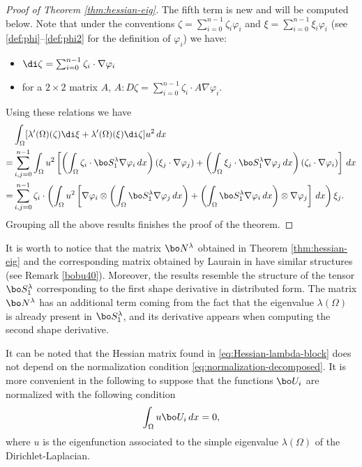 \begin{proof}[Proof of Theorem \ref{thm:hessian-eig}]
The fifth term is new and will be computed below. Note that under the conventions $\zeta = \sum_{i=0}^{n-1} \zeta_i \varphi_i$ and $\xi = \sum_{i=0}^{n-1} \xi_i \varphi_i$ (see \eqref{def:phi}--\eqref{def:phi2} for the definition of $\varphi_i$) we have:
\begin{itemize}
\item $\di \zeta = \sum_{i=0}^{n-1} \zeta_i \cdot \nabla \varphi_i$
\item for a $2\times 2$ matrix $A$, $A : D\zeta = \sum_{i=0}^{n-1} \zeta_i \cdot A\nabla \varphi_i$.
\end{itemize}
Using these relations we have
\begin{align*} &\int_\Omega [\lambda'(\Omega)(\zeta) \di \xi +\lambda'(\Omega)(\xi)\di \zeta] u^2\, dx\\
= & \sum_{i,j=0}^{n-1} \int_\Omega u^2 \left[\left(\int_\Omega \zeta_i \cdot \bo S_1^\lambda \nabla \varphi_i\, dx \right)(\xi_j \cdot \nabla \varphi_j)+\left(\int_\Omega \xi_j \cdot \bo S_1^\lambda \nabla \varphi_j\, dx \right)(\zeta_i \cdot \nabla \varphi_i)\right]\, dx\\
= & \sum_{i,j=0}^{n-1} \zeta_i\cdot \left(\int_\Omega u^2\left[\nabla \varphi_i \otimes \left(\int_\Omega \bo S_1^\lambda \nabla \varphi_j\, dx \right)
+ \left(\int_\Omega \bo S_1^\lambda \nabla \varphi_i\, dx\right)\otimes \nabla \varphi_j \right]\, dx\right) \xi_j.
\end{align*}
Grouping all the above results finishes the proof of the theorem.
\end{proof}

\begin{rem}
It is worth to notice that the matrix $\bo N^\lambda$ obtained in Theorem \ref{thm:hessian-eig} and the corresponding matrix obtained by Laurain in \cite[Prop.\,14]{laurain2ndDeriv} have similar structures (see Remark \ref{bobu40}). Moreover, the results resemble the structure of the tensor $\bo S_1^\lambda$ corresponding to the first shape derivative in distributed form. The matrix $\bo N^\lambda$ has an additional term coming from the fact that the eigenvalue $\lambda(\Omega)$ is already present in $\bo S_1^\lambda$, and its derivative appears when computing the second shape derivative.
\end{rem}

\begin{rem}
It can be noted that the Hessian matrix found in \eqref{eq:Hessian-lambda-block} does not depend on the normalization condition \eqref{eq:normalization-decomposed}. It is more convenient in the following to suppose that the functions $\bo U_i$ are normalized with the following condition
\begin{equation}
\int_\Omega u \bo U_i\, dx = 0,
\label{eq:normalization-alternative}
\end{equation}
where $u$ is the eigenfunction associated to the simple eigenvalue $\lambda(\Omega)$ of the Dirichlet-Laplacian.
\end{rem}

